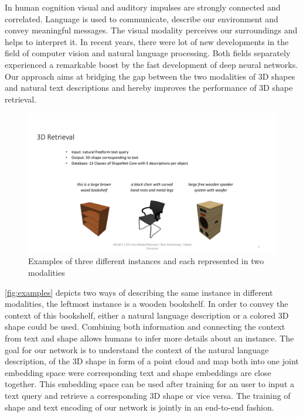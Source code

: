 \documentclass[10pt,twocolumn,letterpaper]{article}
\begin{document}
In human cognition visual and auditory impulses are strongly connected and correlated. Language is used to communicate, describe our environment and convey meaningful messages. The visual modality perceives our surroundings and helps to interpret it. In recent years, there were lot of new developments in the field of computer vision and natural language processing. Both fields separately experienced a remarkable boost by the fast development of deep neural networks. Our approach aims at bridging the gap between the two modalities of 3D shapes and natural text descriptions and hereby improves the performance of 3D shape retrieval.
\begin{figure}[h]%
	\centering
	\includegraphics[width=0.8\linewidth]{fig1.pdf}
	\caption[]{Examples of three different instances and each represented in two modalities}
	\label{fig:examples}
\end{figure}
\autoref{fig:examples} depicts two ways of describing the same instance in different modalities, \eg the leftmost instance is a wooden bookshelf. In order to convey the context of this bookshelf, either a natural language description or a colored 3D shape could be used. Combining both information and connecting the context from text and shape allows humans to infer more details about an instance. The goal for our network is to understand the context of the natural language description, of the 3D shape in form of a point cloud and map both into one joint embedding space were corresponding text and shape embeddings are close together. This embedding space can be used after training for an user to input a text query and retrieve a corresponding 3D shape or vice versa. The training of shape and text encoding of our network is jointly in an end-to-end fashion. 
\end{document}
